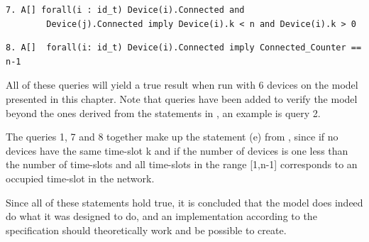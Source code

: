 \begin{lstlisting}[language={[GUI]Uppaal}, % use GUI flavor
columns={[l]flexible},
frameround=fftt, frame=shadowbox, rulesepcolor=\color{gray}, title={This query says that if a device is connected it has a \texttt{k} value between \texttt{0} and \texttt{n}, which is the number of time-slots in the frame}]
7. A[] forall(i : id_t) Device(i).Connected and 
	 	Device(j).Connected imply Device(i).k < n and Device(i).k > 0
\end{lstlisting}

\begin{lstlisting}[language={[GUI]Uppaal}, % use GUI flavor
columns={[l]flexible},
frameround=fftt, frame=shadowbox, rulesepcolor=\color{gray}, title={The query requires that if a device is connected, is it then true that the number of devices connected to a network is equal to one less the number of time-slots in the frame of a network. }]
8. A[]  forall(i: id_t) Device(i).Connected imply Connected_Counter == n-1
\end{lstlisting}

All of these queries will yield a true result when run with 6 devices on the model presented in this chapter.
Note that queries have been added to verify the model beyond the ones derived from the statements in , an example is query 2.

The queries 1, 7 and 8 together make up the statement (e) from , since if no devices have the same time-slot k and if the number of devices is one less than the number of time-slots and all time-slots in the range [1,n-1] corresponds to an occupied time-slot in the network.

Since all of these statements hold true, it is concluded that the model does indeed do what it was designed to do, and an implementation according to the specification should theoretically work and be possible to create.
